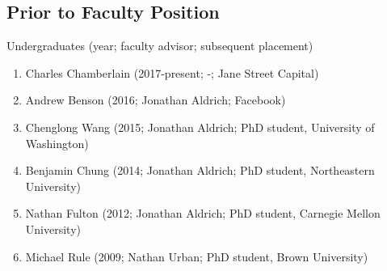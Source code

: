 \documentclass[10pt,letterpaper]{article}
\renewenvironment{itemize}{
  \begin{list}{}{
    \setlength{\leftmargin}{1.25em}
    \setlength{\itemsep}{0.25em}
    \setlength{\parskip}{0pt}
    \setlength{\parsep}{0.2em}
  }
}{
  \end{list}
}
\begin{document}
\subsection*{Prior to Faculty Position}

\begin{itemize}
  \item Undergraduates (year; faculty advisor; subsequent placement)
        \begin{enumerate}
          \item Charles Chamberlain (2017-present; -; Jane Street Capital)
          \item Andrew Benson (2016; Jonathan Aldrich; Facebook)
          \item Chenglong Wang (2015; Jonathan Aldrich; PhD student, University of Washington)
          \item Benjamin Chung (2014; Jonathan Aldrich; PhD student, Northeastern University)
          \item Nathan Fulton (2012; Jonathan Aldrich; PhD student, Carnegie Mellon University)
          \item Michael Rule (2009; Nathan Urban; PhD student, Brown University)
        \end{enumerate}
\end{itemize}
\end{document}
